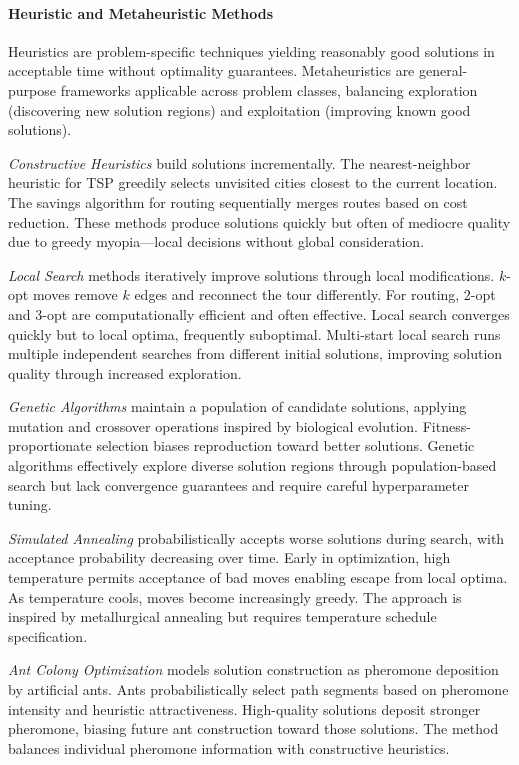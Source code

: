 \paragraph{Heuristic and Metaheuristic Methods}

Heuristics are problem-specific techniques yielding reasonably good solutions in acceptable time without optimality guarantees. Metaheuristics are general-purpose frameworks applicable across problem classes, balancing exploration (discovering new solution regions) and exploitation (improving known good solutions).

\textit{Constructive Heuristics} build solutions incrementally. The nearest-neighbor heuristic for TSP greedily selects unvisited cities closest to the current location. The savings algorithm for routing sequentially merges routes based on cost reduction. These methods produce solutions quickly but often of mediocre quality due to greedy myopia—local decisions without global consideration.

\textit{Local Search} methods iteratively improve solutions through local modifications. $k$-opt moves remove $k$ edges and reconnect the tour differently. For routing, 2-opt and 3-opt are computationally efficient and often effective. Local search converges quickly but to local optima, frequently suboptimal. Multi-start local search runs multiple independent searches from different initial solutions, improving solution quality through increased exploration.

\textit{Genetic Algorithms} maintain a population of candidate solutions, applying mutation and crossover operations inspired by biological evolution. Fitness-proportionate selection biases reproduction toward better solutions. Genetic algorithms effectively explore diverse solution regions through population-based search but lack convergence guarantees and require careful hyperparameter tuning.

\textit{Simulated Annealing} probabilistically accepts worse solutions during search, with acceptance probability decreasing over time. Early in optimization, high temperature permits acceptance of bad moves enabling escape from local optima. As temperature cools, moves become increasingly greedy. The approach is inspired by metallurgical annealing but requires temperature schedule specification.

\textit{Ant Colony Optimization} models solution construction as pheromone deposition by artificial ants. Ants probabilistically select path segments based on pheromone intensity and heuristic attractiveness. High-quality solutions deposit stronger pheromone, biasing future ant construction toward those solutions. The method balances individual pheromone information with constructive heuristics.

